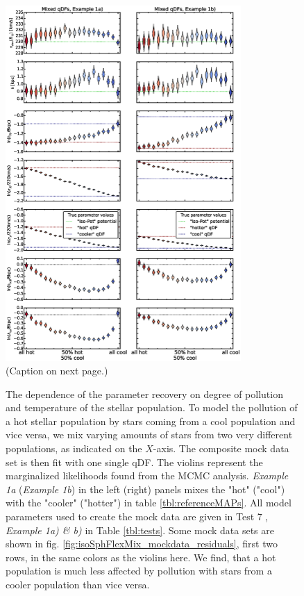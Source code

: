 \begin{figure}
\centering
\includegraphics[width=0.8\textwidth]{figs/isoSphFlexMixCont_violins.eps}
\caption{(Caption on next page.)}
\end{figure}


\addtocounter{figure}{-1}
\begin{figure} [t!]
\caption{The dependence of the parameter recovery on degree of pollution and temperature of the stellar population. To model the pollution of a hot stellar population by stars coming from a cool population and vice versa, we mix varying amounts of stars from two very different populations, as indicated on the $X$-axis. The composite mock data set is then fit with one single qDF. The violins represent the marginalized likelihoods found from the MCMC analysis. \emph{Example 1a} (\emph{Example 1b}) in the left (right) panels mixes the "hot" ("cool") \MAP with the "cooler" ("hotter") \MAP in table \ref{tbl:referenceMAPs}. All model parameters used to create the mock data are given in Test \textcircled{7}, \emph{Example 1a) \& b)} in Table \ref{tbl:tests}. Some mock data sets are shown in fig. \ref{fig:isoSphFlexMix_mockdata_residuals}, first two rows, in the same colors as the violins here.  We find, that a hot population is much less affected by pollution with stars from a cooler population than vice versa.}
\label{fig:isoSphFlexMixCont}
\end{figure}



